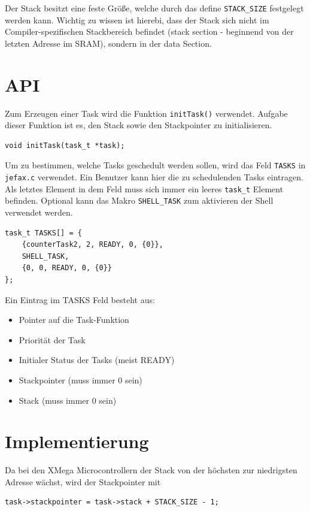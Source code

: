 \documentclass[fontsize=12pt, toc=bibliography, notitlepage]{scrreprt}
\begin{document}
Der Stack besitzt eine feste Größe, welche durch das define \lstinline$STACK_SIZE$ festgelegt werden kann. Wichtig zu wissen ist hierebi, dass der Stack sich nicht im Compiler-spezifischen Stackbereich befindet (stack section - beginnend von der letzten Adresse im SRAM), sondern in der data  Section.

\section{API}
\label{subsec:tasks-api}
Zum Erzeugen einer Task wird die Funktion \lstinline$initTask()$ verwendet. Aufgabe dieser Funktion ist es, den Stack sowie den Stackpointer zu initialisieren.

\begin{lstlisting}
void initTask(task_t *task);
\end{lstlisting}

Um zu bestimmen, welche Tasks geschedult werden sollen, wird das Feld \lstinline$TASKS$ in \lstinline$jefax.c$ verwendet. Ein Benutzer kann hier die zu schedulenden Tasks eintragen. Als letztes Element in dem Feld muss sich immer ein leeres \lstinline$task_t$ Element befinden. Optional kann das Makro \lstinline$SHELL_TASK$ zum aktivieren der Shell verwendet werden.

\begin{lstlisting}[title=jefax.c]
task_t TASKS[] = {
    {counterTask2, 2, READY, 0, {0}},
    SHELL_TASK,
    {0, 0, READY, 0, {0}}
};
\end{lstlisting}

Ein Eintrag im TASKS Feld besteht aus:

\begin{itemize}
\item Pointer auf die Task-Funktion
\item Priorität der Task
\item Initialer Status der Tasks (meist READY)
\item Stackpointer (muss immer 0 sein)
\item Stack (muss immer {0} sein)
\end{itemize}

\section{Implementierung}
\label{subsec:tasks-impl}
Da bei den XMega Microcontrollern der Stack von der höchsten zur niedrigsten Adresse wächst, wird der Stackpointer mit

\begin{lstlisting}
task->stackpointer = task->stack + STACK_SIZE - 1;
\end{lstlisting}
\end{document}
